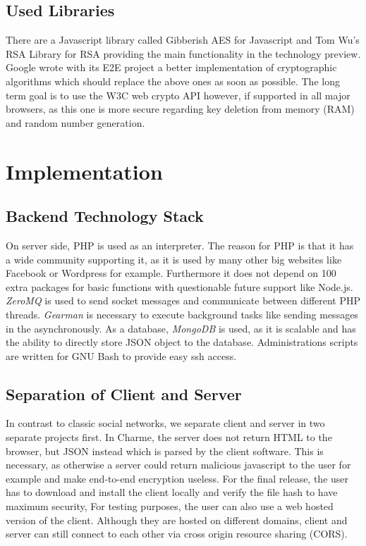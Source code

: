 \documentclass{scrartcl}
\begin{document}
\subsection{Used Libraries}
There are a Javascript library called Gibberish AES for Javascript and Tom Wu's RSA Library for RSA providing the main functionality in the technology preview. Google wrote with its E2E project a better implementation of cryptographic algorithms which should replace the above ones as soon as possible. The long term goal is to use the W3C web crypto API however, if supported in all major browsers, as this one is more secure regarding key deletion from memory (RAM) and random number generation. 

\newpage
\section{Implementation}
\subsection{Backend Technology Stack}
On server side, PHP is used as an interpreter. The reason for PHP is that it has a wide community supporting it, as it is used by many other big websites like Facebook or Wordpress for example. Furthermore it does not depend on 100 extra packages for basic functions with questionable future support like Node.js.
 \textit{ZeroMQ} is used to send socket messages and communicate between different PHP threads. \textit{Gearman} is necessary to execute background tasks like sending messages in the asynchronously. As a database, \textit{MongoDB} is used, as it is scalable and has the ability to directly store JSON object to the database.
Administrations scripts are written for GNU Bash to provide easy ssh access.



 \subsection{Separation of Client and Server}
In contrast to classic social networks, we separate client and server in two separate projects first. In Charme, the server does not return HTML to the browser, but JSON instead which is parsed by the client software. This is necessary, as otherwise a server could return malicious javascript to the user for example and make end-to-end encryption useless. For the final release, the user has to download and install the client locally and verify the file hash to have maximum security, For testing purposes, the user can also use a web hosted version of the client. Although they are hosted on different domains, client and server can still connect to each other via cross origin resource sharing (CORS).
\end{document}
